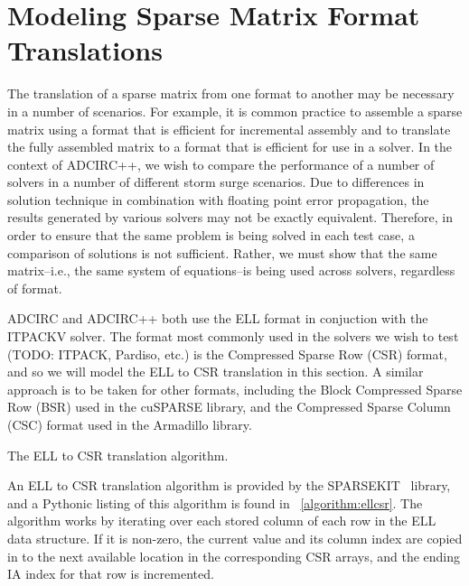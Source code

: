 \section{Modeling Sparse Matrix Format Translations}

The translation of a sparse matrix from one format to another may be necessary in a number of scenarios.  For example, it is common practice to assemble a sparse matrix using a format that is efficient for incremental assembly and to translate the fully assembled matrix to a format that is efficient for use in a solver.  In the context of ADCIRC++, we wish to compare the performance of a number of solvers in a number of different storm surge scenarios.  
Due to differences in solution technique in combination with floating point error propagation, the results generated by various solvers may not be exactly equivalent.  Therefore, in order to ensure that the same problem is being solved in each test case, a comparison of solutions is not sufficient.  Rather, we must show that the same matrix--i.e., the same system of equations--is being used across solvers, regardless of format.

ADCIRC and ADCIRC++ both use the ELL format in conjuction with the ITPACKV solver.  The format most commonly used in the solvers we wish to test (TODO: ITPACK, Pardiso, etc.) is the Compressed Sparse Row (CSR) format, and so we will model the ELL to CSR translation in this section.  A similar approach is to be taken for other formats, including the Block Compressed Sparse Row (BSR) used in the cuSPARSE library, and the Compressed Sparse Column (CSC) format used in the Armadillo library.

\LinesNumbered
\begin{algorithm}

\caption{The ELL to CSR translation algorithm.}
\label{algorithm:ellcsr}
\end{algorithm}
\LinesNotNumbered

An ELL to CSR translation algorithm is provided by the SPARSEKIT~\cite{sparsekit} library, and a Pythonic listing of this algorithm is found in \figurename~\ref{algorithm:ellcsr}.  The algorithm works by iterating over each stored column of each row in the ELL data structure.  If it is non-zero, the current value and its column index are copied in to the next available location in the corresponding CSR arrays, and the ending IA index for that row is incremented.

